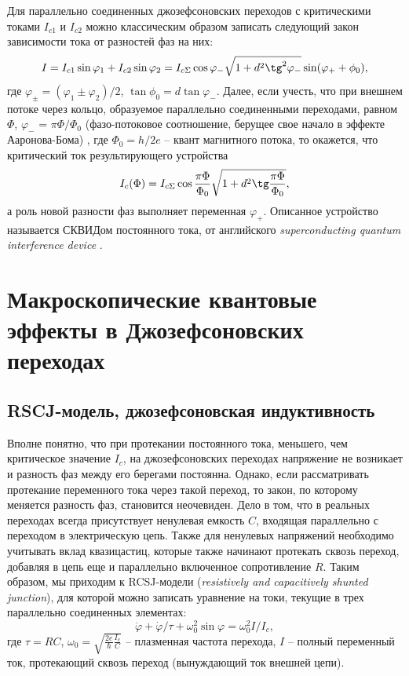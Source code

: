 \documentclass[14pt, a4paper]{extreport}
\numberwithin{equation}{section}
\begin{document}
Для параллельно соединенных джозефсоновских переходов с критическими токами $I_{c1}$ и $I_{c2}$ можно классическим образом записать следующий закон зависимости тока от разностей фаз на них:
\begin{equation}
	I = I_{c1}\sin \varphi_1 + I_{c2}\sin \varphi_2 = I_{c\Sigma} \cos \varphi_- \sqrt{1+d^2 \tg^2 \varphi_-} \sin (\varphi_+ + \phi_0),
\end{equation}
где $\varphi_{\pm} = (\varphi_1 \pm \varphi_2)/2$, $\tan \phi_0 = d \tan \varphi_-$. Далее, если учесть, что при внешнем потоке через кольцо, образуемое параллельно соединенными переходами, равном $\Phi$, $\varphi_-$ = $\pi \Phi/\Phi_0$ (фазо-потоковое соотношение, берущее свое начало в эффекте Ааронова-Бома) \cite{shmidt}, где $\Phi_0 = h/2e$ -- квант магнитного потока, то окажется, что критический ток результирующего устройства
\begin{equation}
	I_c (\Phi) = I_{c\Sigma} \cos \frac{\pi \Phi}{\Phi_0} \sqrt{1+d^2 \tg \frac{\pi \Phi}{\Phi_0}},\label{eq:Ic_squid_asym}
\end{equation}
а роль новой разности фаз выполняет переменная $\varphi_+$. Описанное устройство называется СКВИДом постоянного тока, от английского \textit{superconducting quantum interference device} \cite{jacklevic1964silver, jaklevic1964quantum}.

\section{Макроскопические квантовые эффекты в Джозефсоновских переходах}
\subsection{RSCJ-модель, джозефсоновская индуктивность}

Вполне понятно, что при протекании постоянного тока, меньшего, чем критическое значение $I_c$, на джозефсоновских переходах напряжение не возникает и разность фаз между его берегами постоянна. Однако, если рассматривать протекание переменного тока через такой переход, то закон, по которому меняется разность фаз, становится неочевиден. Дело в том, что в реальных переходах всегда присутствует ненулевая емкость $C$, входящая параллельно с переходом в электрическую цепь. Также для ненулевых напряжений необходимо учитывать вклад квазицастиц, которые также начинают протекать сквозь переход, добавляя в цепь еще и параллельно включенное сопротивление $R$. Таким образом, мы приходим к RCSJ-модели (\textit{resistively and capacitively shunted junction}), для которой можно записать уравнение на токи, текущие в трех параллельно соединенных элементах\cite{stewart1968current}:
\begin{equation}
	\ddot \varphi + \dot \varphi/\tau + \omega_0^2 \sin \varphi = \omega_0^2 I/I_c,\label{eq:rcsj_current}
\end{equation}
где $\tau = RC$, $\omega_0 =\sqrt{\frac{2e}{\hbar}\frac{I_c}{C}}$ -- плазменная частота перехода, $I$ -- полный переменный ток, протекающий сквозь переход (вынуждающий ток внешней цепи). 
\end{document}
